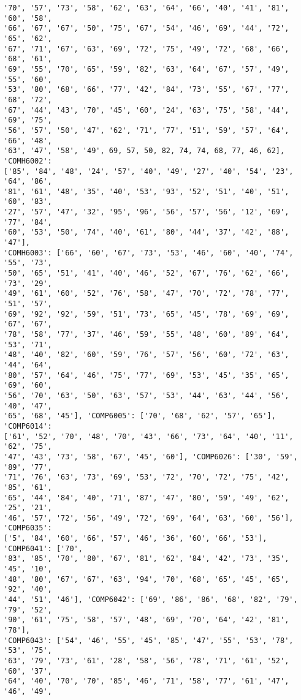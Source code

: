 \documentclass[11pt]{article}
\begin{document}
\begin{Verbatim}[commandchars=\\\{\}]
'70', '57', '73', '58', '62', '63', '64', '66', '40', '41', '81', '60', '58',
'66', '67', '67', '50', '75', '67', '54', '46', '69', '44', '72', '65', '62',
'67', '71', '67', '63', '69', '72', '75', '49', '72', '68', '66', '68', '61',
'69', '55', '70', '65', '59', '82', '63', '64', '67', '57', '49', '55', '60',
'53', '80', '68', '66', '77', '42', '84', '73', '55', '67', '77', '68', '72',
'67', '44', '43', '70', '45', '60', '24', '63', '75', '58', '44', '69', '75',
'56', '57', '50', '47', '62', '71', '77', '51', '59', '57', '64', '66', '48',
'63', '47', '58', '49', 69, 57, 50, 82, 74, 74, 68, 77, 46, 62], 'COMH6002':
['85', '84', '48', '24', '57', '40', '49', '27', '40', '54', '23', '64', '86',
'81', '61', '48', '35', '40', '53', '93', '52', '51', '40', '51', '60', '83',
'27', '57', '47', '32', '95', '96', '56', '57', '56', '12', '69', '77', '84',
'60', '53', '50', '74', '40', '61', '80', '44', '37', '42', '88', '47'],
'COMH6003': ['66', '60', '67', '73', '53', '46', '60', '40', '74', '55', '73',
'50', '65', '51', '41', '40', '46', '52', '67', '76', '62', '66', '73', '29',
'49', '61', '60', '52', '76', '58', '47', '70', '72', '78', '77', '51', '57',
'69', '92', '92', '59', '51', '73', '65', '45', '78', '69', '69', '67', '67',
'78', '58', '77', '37', '46', '59', '55', '48', '60', '89', '64', '53', '71',
'48', '40', '82', '60', '59', '76', '57', '56', '60', '72', '63', '44', '64',
'80', '57', '64', '46', '75', '77', '69', '53', '45', '35', '65', '69', '60',
'56', '70', '63', '50', '63', '57', '53', '44', '63', '44', '56', '40', '47',
'65', '68', '45'], 'COMP6005': ['70', '68', '62', '57', '65'], 'COMP6014':
['61', '52', '70', '48', '70', '43', '66', '73', '64', '40', '11', '62', '75',
'47', '43', '73', '58', '67', '45', '60'], 'COMP6026': ['30', '59', '89', '77',
'71', '76', '63', '73', '69', '53', '72', '70', '72', '75', '42', '85', '61',
'65', '44', '84', '40', '71', '87', '47', '80', '59', '49', '62', '25', '21',
'46', '57', '72', '56', '49', '72', '69', '64', '63', '60', '56'], 'COMP6035':
['5', '84', '60', '66', '57', '46', '36', '60', '66', '53'], 'COMP6041': ['70',
'83', '85', '70', '80', '67', '81', '62', '84', '42', '73', '35', '45', '10',
'48', '80', '67', '67', '63', '94', '70', '68', '65', '45', '65', '92', '40',
'44', '51', '46'], 'COMP6042': ['69', '86', '86', '68', '82', '79', '79', '52',
'90', '61', '75', '58', '57', '48', '69', '70', '64', '42', '81', '78'],
'COMP6043': ['54', '46', '55', '45', '85', '47', '55', '53', '78', '53', '75',
'63', '79', '73', '61', '28', '58', '56', '78', '71', '61', '52', '60', '37',
'64', '40', '70', '70', '85', '46', '71', '58', '77', '61', '47', '46', '49',

\end{Verbatim}
\end{document}
